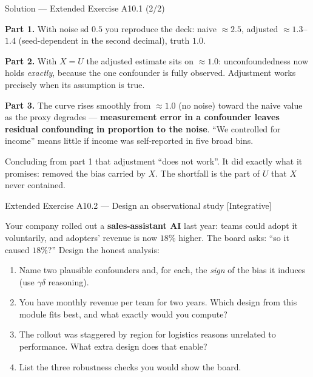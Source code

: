 \documentclass[aspectratio=169,11pt]{beamer}
\begin{document}
\begin{frame}{Solution --- Extended Exercise A10.1 (2/2)}
  \begin{solutionbox}
    \footnotesize
    \textbf{Part 1.} With noise sd $0.5$ you reproduce the deck: naive
    $\approx 2.5$, adjusted $\approx 1.3$--$1.4$ (seed-dependent in the second
    decimal), truth $1.0$.
    \par\smallskip
    \textbf{Part 2.} With $X = U$ the adjusted estimate sits on $\approx 1.0$:
    unconfoundedness now holds \emph{exactly}, because the one confounder is fully
    observed. Adjustment works precisely when its assumption is true.
    \par\smallskip
    \textbf{Part 3.} The curve rises smoothly from $\approx 1.0$ (no noise) toward
    the naive value as the proxy degrades --- \textbf{measurement error in a
    confounder leaves residual confounding in proportion to the noise}. ``We
    controlled for income'' means little if income was self-reported in five broad
    bins.
  \end{solutionbox}
  \begin{mistake}
    Concluding from part 1 that adjustment ``does not work''. It did exactly what it
    promises: removed the bias carried by $X$. The shortfall is the part of $U$
    that $X$ never contained.
  \end{mistake}
\end{frame}

\begin{frame}{Extended Exercise A10.2 --- Design an observational study [Integrative]}
  \begin{longexercise}
    Your company rolled out a \textbf{sales-assistant AI} last year: teams could
    adopt it voluntarily, and adopters' revenue is now $18\%$ higher. The board
    asks: ``so it caused $18\%$?'' Design the honest analysis:
    \begin{enumerate}
      \item Name two plausible confounders and, for each, the \emph{sign} of the
            bias it induces (use $\gamma\delta$ reasoning).
      \item You have monthly revenue per team for two years. Which design from this
            module fits best, and what exactly would you compute?
      \item The rollout was staggered by region for logistics reasons unrelated to
            performance. What extra design does that enable?
      \item List the three robustness checks you would show the board.
    \end{enumerate}
  \end{longexercise}
\end{frame}
\end{document}
